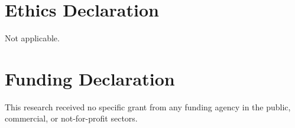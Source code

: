 \documentclass{article}
\begin{document}
\section*{Ethics Declaration}
Not applicable.

\section*{Funding Declaration}
This research received no specific grant from any funding agency in the public, commercial, or not-for-profit sectors.


\end{document}
